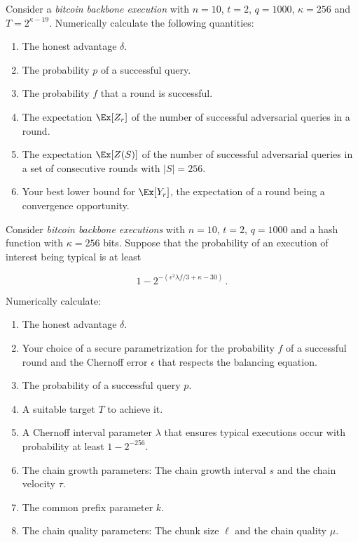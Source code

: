\begin{problems}
    \item Consider a \emph{bitcoin backbone execution} with $n = 10$, $t = 2$,
          $q = 1000$, $\kappa = 256$ and $T = 2^{\kappa - 19}$. Numerically
          calculate the following quantities:

          \begin{enumerate}
            \item The honest advantage $\delta$.
            \item The probability $p$ of a successful query.
            \item The probability $f$ that a round is successful.
            \item The expectation $\Ex[Z_r]$ of the number of successful
                  adversarial queries in a round.
            \item The expectation $\Ex[Z(S)]$ of the number of successful
                  adversarial queries in a set of consecutive rounds with
                  $|S| = 256$.
            \item Your best lower bound for $\Ex[Y_r]$, the expectation of a
                  round being a convergence opportunity.
          \end{enumerate}

    \item Consider \emph{bitcoin backbone executions} with $n = 10$, $t = 2$,
          $q = 1000$ and a hash function with $\kappa = 256$ bits. Suppose that
          the probability of an execution of interest being typical is at least

          \[
          1 - 2^{-(\epsilon^2\lambda f/3 + \kappa - 30)}\,.
          \]

          Numerically calculate:

          \begin{enumerate}
            \item The honest advantage $\delta$.
            \item Your choice of a secure parametrization for the probability
                  $f$ of a successful round and the Chernoff error $\epsilon$
                  that respects the balancing equation.
            \item The probability of a successful query $p$.
            \item A suitable target $T$ to achieve it.
            \item A Chernoff interval parameter $\lambda$ that ensures typical
                  executions occur with probability at least $1 - 2^{-256}$.
            \item The chain growth parameters: The chain growth interval $s$ and
                  the chain velocity $\tau$.
            \item The common prefix parameter $k$.
            \item The chain quality parameters: The chunk size $\ell$ and the
                  chain quality $\mu$.
          \end{enumerate}


\end{problems}
